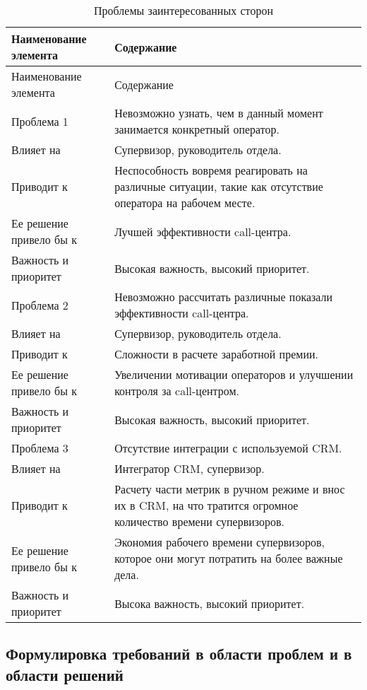 \begin{small}
\begin{longtable}{|p{}|p{}|}
    \caption{Проблемы заинтересованных сторон}
    \label{tab:problem}
    \\ \hline
    Наименование элемента & Содержание \\
    \hline \endfirsthead
    \hline
    Наименование элемента & Содержание \\
    \hline
    \endhead
    \hline \endlastfoot
    Проблема 1 & Невозможно узнать, чем в данный момент занимается конкретный оператор. \\
    Влияет на & Супервизор, руководитель отдела. \\
    Приводит к & Неспособность вовремя реагировать на различные ситуации, такие как отсутствие оператора на рабочем месте. \\
    Ее решение привело бы к & Лучшей эффективности call-центра. \\
    Важность и приоритет & Высокая важность, высокий приоритет. \\
    \hline
    Проблема 2 & Невозможно рассчитать различные показали эффективности call-центра. \\
    Влияет на & Супервизор, руководитель отдела. \\
    Приводит к & Сложности в расчете заработной премии. \\
    Ее решение привело бы к & Увеличении мотивации операторов и улучшении контроля за call-центром. \\
    Важность и приоритет & Высокая важность, высокий приоритет. \\
    \hline
    Проблема 3 & Отсутствие интеграции с используемой CRM\@. \\
    Влияет на & Интегратор CRM, супервизор. \\
    Приводит к & Расчету части метрик в ручном режиме и внос их в CRM, на что тратится огромное количество времени супервизоров. \\
    Ее решение привело бы к & Экономия рабочего времени супервизоров, которое они могут потратить на более важные дела. \\
    Важность и приоритет & Высока важность, высокий приоритет. \\
\end{longtable}
\end{small}

\subsection{Формулировка требований в области проблем и в области решений} %

